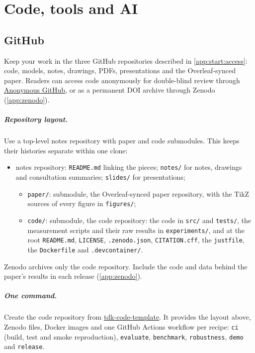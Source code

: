 \chapter{Code, tools and AI}\label{app:code}
\section{GitHub}\label{app:code:github}
Keep your work in the three GitHub repositories described in \cref{app:start:access}: code, models, notes, drawings, PDFs, presentations and the Overleaf-synced paper. Readers can access code anonymously for double-blind review through \href{https://anonymous.4open.science/}{Anonymous GitHub}, or as a permanent DOI archive through Zenodo (\cref{app:zenodo}).

\paragraph{Repository layout.} Use a top-level notes repository with paper and code submodules. This keeps their histories separate within one clone:
\begin{itemize}[noitemsep]
  \item notes repository: \texttt{README.md} linking the pieces; \texttt{notes/} for notes, drawings and consultation summaries; \texttt{slides/} for presentations;
  \begin{itemize}[noitemsep]
    \item \texttt{paper/}: submodule, the Overleaf-synced paper repository, with the TikZ sources of every figure in \texttt{figures/};
    \item \texttt{code/}: submodule, the code repository: the code in \texttt{src/} and \texttt{tests/}, the measurement scripts and their raw results in \texttt{experiments/}, and at the root \texttt{README.md}, \texttt{LICENSE}, \texttt{.zenodo.json}, \texttt{CITATION.cff}, the \texttt{justfile}, the \texttt{Dockerfile} and \texttt{.devcontainer/}.
  \end{itemize}
\end{itemize}
Zenodo archives only the code repository. Include the code and data behind the paper's results in each release (\cref{app:zenodo}).

\paragraph{One command.} Create the code repository from \href{https://github.com/BlackLight54/tdk-code-template}{tdk-code-template}. It provides the layout above, Zenodo files, Docker images and one GitHub Actions workflow per recipe: \texttt{ci} (build, test and smoke reproduction), \texttt{evaluate}, \texttt{benchmark}, \texttt{robustness}, \texttt{demo} and \texttt{release}.

